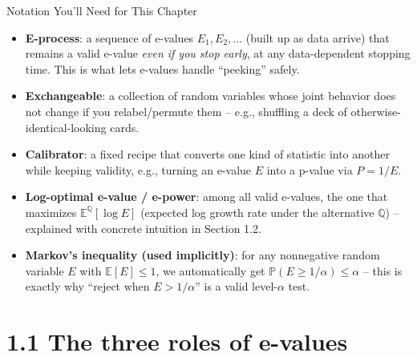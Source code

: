 \documentclass[aspectratio=169,10pt]{beamer}
\begin{document}
\begin{frame}[allowframebreaks]{Notation You'll Need for This Chapter}
\begin{itemize}
\framebreak

  \item \textbf{E-process}: a sequence of e-values $E_1, E_2, \dots$ (built
    up as data arrive) that remains a valid e-value \emph{even if you stop
    early}, at any data-dependent stopping time. This is what lets e-values
    handle ``peeking'' safely.
  \item \textbf{Exchangeable}: a collection of random variables whose joint
    behavior does not change if you relabel/permute them -- e.g., shuffling
    a deck of otherwise-identical-looking cards.
  \item \textbf{Calibrator}: a fixed recipe that converts one kind of
    statistic into another while keeping validity, e.g., turning an e-value
    $E$ into a p-value via $P = 1/E$.
  \item \textbf{Log-optimal e-value / e-power}: among all valid e-values,
    the one that maximizes $\mathbb{E}^{\mathbb{Q}}[\log E]$ (expected log
    growth rate under the alternative $\mathbb{Q}$) -- explained with
    concrete intuition in Section 1.2.
  \item \textbf{Markov's inequality (used implicitly)}: for any nonnegative
    random variable $E$ with $\mathbb{E}[E]\le 1$, we automatically get
    $\mathbb{P}(E \ge 1/\alpha) \le \alpha$ -- this is exactly why
    ``reject when $E > 1/\alpha$'' is a valid level-$\alpha$ test.
\end{itemize}

\end{frame}

\section{1.1 The three roles of e-values}
\end{document}
